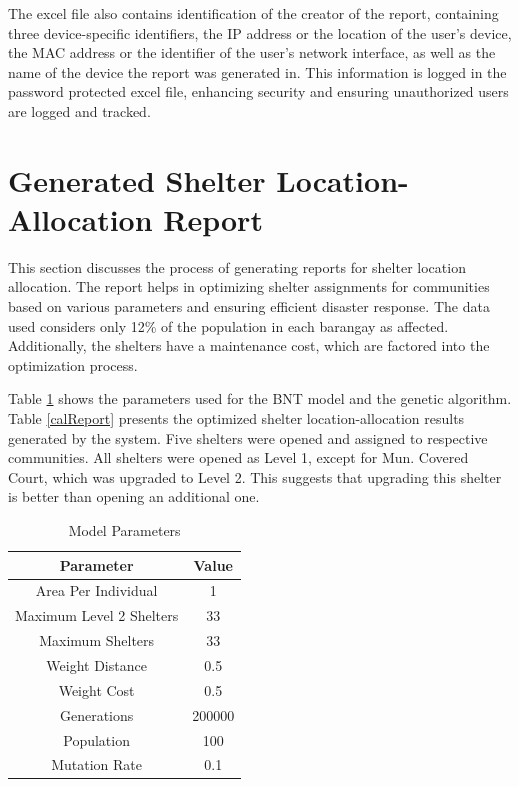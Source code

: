	The excel file also contains identification of the creator of the report, containing three device-specific identifiers, the IP address or the location of the user’s device, the MAC address or the identifier of the user’s network interface, as well as the name of the device the report was generated in. This information is logged in the password protected excel file, enhancing security and ensuring unauthorized users are logged and tracked. 
	
\section{Generated Shelter Location-Allocation Report}
	This section discusses the process of generating reports for shelter location allocation. The report helps in optimizing shelter assignments for communities based on various parameters and ensuring efficient disaster response. The data used considers only 12\% of the population in each barangay as affected. Additionally, the shelters have a maintenance cost, which are factored into the optimization process.
	
	Table \ref{modelParams} shows the parameters used for the BNT model and the genetic algorithm. Table \ref{calReport} presents the optimized shelter location-allocation results generated by the system. Five shelters were opened and assigned to respective communities. All shelters were opened as Level 1, except for Mun. Covered Court, which was upgraded to Level 2. This suggests that upgrading this shelter is better than opening an additional one.
	
	\begin{table}[h]
		\centering
		\caption{Model Parameters}
		\label{modelParams}
		\begin{tabular}{|c|c|}
			\hline
			\textbf{Parameter} & \textbf{Value} \\ \hline
			Area Per Individual & 1 \\ 
			Maximum Level 2 Shelters  & 33 \\ 
			Maximum Shelters & 33 \\ 
			Weight Distance & 0.5 \\ 
			Weight Cost & 0.5 \\ 
			Generations & 200000 \\ 
			Population & 100 \\ 
			Mutation Rate & 0.1 \\ \hline
		\end{tabular}
	\end{table}
	
